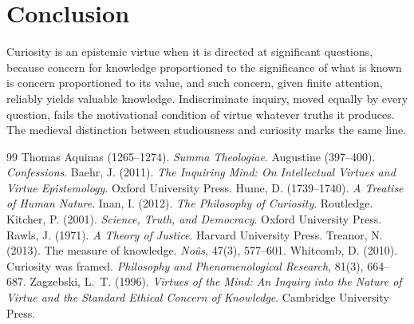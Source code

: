 \documentclass{situationist-preprint}
\begin{document}
\section{Conclusion}

Curiosity is an epistemic virtue when it is directed at significant questions, because concern for knowledge proportioned to the significance of what is known is concern proportioned to its value, and such concern, given finite attention, reliably yields valuable knowledge. Indiscriminate inquiry, moved equally by every question, fails the motivational condition of virtue whatever truths it produces. The medieval distinction between studiousness and curiosity marks the same line.

\begin{thebibliography}{99}\small
{} Thomas Aquinas (1265--1274). \emph{Summa Theologiae}.
 Augustine (397--400). \emph{Confessions}.
 Baehr, J. (2011). \emph{The Inquiring Mind: On Intellectual Virtues and Virtue Epistemology}. Oxford University Press.
 Hume, D. (1739--1740). \emph{A Treatise of Human Nature}.
 Inan, I. (2012). \emph{The Philosophy of Curiosity}. Routledge.
 Kitcher, P. (2001). \emph{Science, Truth, and Democracy}. Oxford University Press.
 Rawls, J. (1971). \emph{A Theory of Justice}. Harvard University Press.
 Treanor, N. (2013). The measure of knowledge. \emph{No\^us}, 47(3), 577--601.
 Whitcomb, D. (2010). Curiosity was framed. \emph{Philosophy and Phenomenological Research}, 81(3), 664--687.
 Zagzebski, L.~T. (1996). \emph{Virtues of the Mind: An Inquiry into the Nature of Virtue and the Standard Ethical Concern of Knowledge}. Cambridge University Press.
\end{thebibliography}
\end{document}
